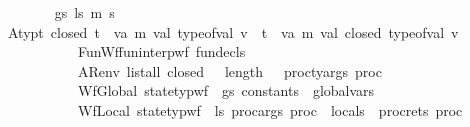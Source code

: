 \begin{isabellebody}
\ \ \ \ \isamarkupfalse%
\ {\isasymGamma}\ {\isasymOmega}\ gs\ ls\ m{\isacharprime}{\kern0pt}\ s{\isacharprime}{\kern0pt}\ \isanewline
\ \ \ \ \isamarkupfalse%
\ Atyp{\isacharcolon}{\kern0pt}{\isachardoublequoteopen}{\isacharparenleft}{\kern0pt}{\isasymforall}t{\isachardot}{\kern0pt}\ closed\ t\ {\isasymlongrightarrow}\ {\isacharparenleft}{\kern0pt}{\isasymexists}v{\isacharcolon}{\kern0pt}{\isacharcolon}{\kern0pt}{\isacharparenleft}{\kern0pt}{\isacharprime}{\kern0pt}a{\isacharcomma}{\kern0pt}\ {\isacharprime}{\kern0pt}m{\isacharparenright}{\kern0pt}\ val{\isachardot}{\kern0pt}\ type{\isacharunderscore}{\kern0pt}of{\isacharunderscore}{\kern0pt}val\ v\ {\isacharequal}{\kern0pt}\ t{\isacharparenright}{\kern0pt}{\isacharparenright}{\kern0pt}\ {\isasymand}\ {\isacharparenleft}{\kern0pt}{\isasymforall}v{\isacharcolon}{\kern0pt}{\isacharcolon}{\kern0pt}{\isacharparenleft}{\kern0pt}{\isacharprime}{\kern0pt}a{\isacharcomma}{\kern0pt}\ {\isacharprime}{\kern0pt}m{\isacharparenright}{\kern0pt}\ val{\isachardot}{\kern0pt}\ closed\ {\isacharparenleft}{\kern0pt}type{\isacharunderscore}{\kern0pt}of{\isacharunderscore}{\kern0pt}val\ v{\isacharparenright}{\kern0pt}{\isacharparenright}{\kern0pt}{\isachardoublequoteclose}\ \isanewline
\ \ \ \ \ \ \ \ \ \ \ FunWf{\isacharcolon}{\kern0pt}{\isachardoublequoteopen}fun{\isacharunderscore}{\kern0pt}interp{\isacharunderscore}{\kern0pt}wf\ fun{\isacharunderscore}{\kern0pt}decls\ {\isasymGamma}{\isachardoublequoteclose}\ \isanewline
\ \ \ \ \ \ \ \ \ \ \ ARenv{\isacharcolon}{\kern0pt}\ {\isachardoublequoteopen}list{\isacharunderscore}{\kern0pt}all\ closed\ {\isasymOmega}\ {\isasymand}\ length\ {\isasymOmega}\ {\isacharequal}{\kern0pt}\ proc{\isacharunderscore}{\kern0pt}ty{\isacharunderscore}{\kern0pt}args\ proc{\isachardoublequoteclose}\ \isanewline
\ \ \ \ \ \ \ \ \ \ \ WfGlobal{\isacharcolon}{\kern0pt}\ {\isachardoublequoteopen}state{\isacharunderscore}{\kern0pt}typ{\isacharunderscore}{\kern0pt}wf\ {\isasymOmega}\ gs\ {\isacharparenleft}{\kern0pt}constants\ {\isacharat}{\kern0pt}\ global{\isacharunderscore}{\kern0pt}vars{\isacharparenright}{\kern0pt}{\isachardoublequoteclose}\ \isanewline
\ \ \ \ \ \ \ \ \ \ \ WfLocal{\isacharcolon}{\kern0pt}\ {\isachardoublequoteopen}state{\isacharunderscore}{\kern0pt}typ{\isacharunderscore}{\kern0pt}wf\ {\isasymOmega}\ ls\ {\isacharparenleft}{\kern0pt}proc{\isacharunderscore}{\kern0pt}args\ proc\ {\isacharat}{\kern0pt}\ locals\ {\isacharat}{\kern0pt}\ proc{\isacharunderscore}{\kern0pt}rets\ proc{\isacharparenright}{\kern0pt}{\isachardoublequoteclose}\ \isanewline

\end{isabellebody}
